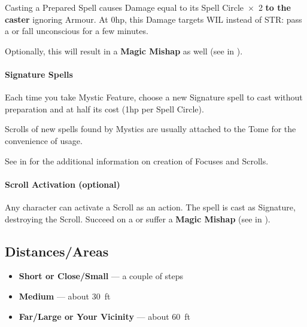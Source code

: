 \documentclass[itdr]{subfiles}
\begin{document}
Casting a Prepared Spell causes Damage equal to its Spell Circle~$\times$~2 \textbf{to the caster} ignoring Armour. At 0hp, this Damage targets WIL instead of STR: pass a  or fall unconscious for a few minutes.
\begin{dbox}
Optionally, this will result in a \textbf{Magic Mishap} as well (see \textbf{} in \textbf{}).
\end{dbox}

\vfill

\paragraph{Signature Spells}
Each time you take Mystic Feature, choose a new Signature spell to cast without preparation and at half its cost (1hp per Spell Circle).

\vfill

\begin{dbox}
	Scrolls of new spells found by Mystics are usually attached to the Tome for the convenience of usage.
	
	See \textbf{} in \mbox{\textbf{}} for the additional information on creation of Focuses and Scrolls.
\end{dbox}

\break

\begin{dbox}
	\paragraph{Scroll Activation (optional)}
	Any character can activate a Scroll as an action. The spell is cast as Signature, destroying the Scroll. Succeed on a  or suffer a \textbf{Magic Mishap} (see \textbf{} in \textbf{}).
\end{dbox}

\vfill


\begin{dbox}
	\subsection*{Distances/Areas}
	\begin{itemize}
		\item \textbf{Short or Close/Small} --- a couple of steps
		\item \textbf{Medium} --- about 30~ft
		\item \textbf{Far/Large or Your Vicinity} --- about 60~ft
	\end{itemize}
\end{dbox}
\end{document}
